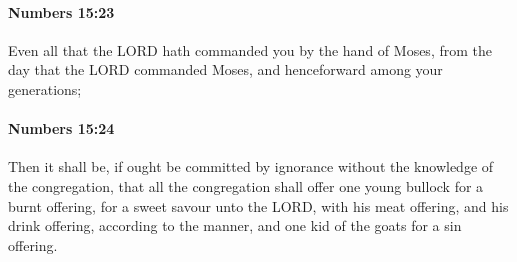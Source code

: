 		\paragraph{Numbers 15:23} %
			\label{NUMBERS-15-23}

			Even all that the LORD hath commanded you by the hand of Moses, from the day that the LORD commanded Moses, and henceforward among your generations;


		\paragraph{Numbers 15:24} %
			\label{NUMBERS-15-24}

			Then it shall be, if ought be committed by ignorance without the knowledge of the congregation, that all the congregation shall offer one young bullock for a burnt offering, for a sweet savour unto the LORD, with his meat offering, and his drink offering, according to the manner, and one kid of the goats for a sin offering.

